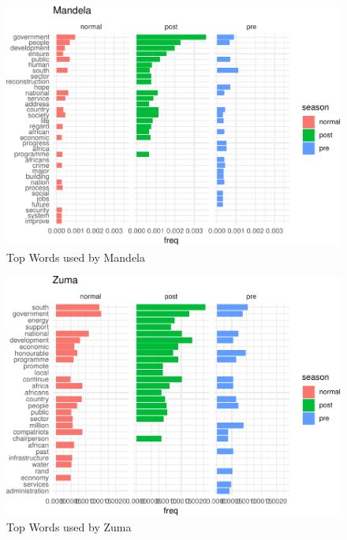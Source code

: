 \documentclass[]{article}
\begin{document}
\begin{figure}[H]

{\centering \includegraphics{datasci_fi_Assignment_2_files/figure-latex/mandela -1} 

}

\caption{Top Words used by Mandela}\label{fig:mandela }
\end{figure}

\begin{figure}[H]

{\centering \includegraphics{datasci_fi_Assignment_2_files/figure-latex/zuma -1} 

}

\caption{Top Words used by Zuma}\label{fig:zuma }
\end{figure}
\end{document}
